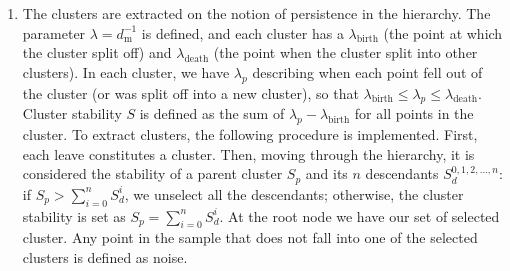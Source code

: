\documentclass[fleqn,usenatbib]{mnras}
\newcommand{\rlopes}[1]{\textcolor{blue}{#1}}
\begin{document}
\begin{enumerate}
\item The clusters are extracted on the notion of persistence in the hierarchy.
  The parameter $\lambda = d_{\mathrm{m}}^{-1}$ is defined, and each cluster has a
  $\lambda_{\mathrm{birth}}$ (the point at which the cluster split off) and
  $\lambda_{\mathrm{death}}$ (the point when the cluster split into other clusters).
  In each cluster, we have $\lambda_p$ describing when each point fell out of the
  cluster (or was split off into a new cluster), so that $\lambda_{\mathrm{birth}} \leq \lambda_{p} \leq \lambda_{\mathrm{death}}$.
  Cluster stability $S$ is defined as the sum of $\lambda_{p} - \lambda_{\mathrm{birth}}$
  for all points in the cluster. To extract clusters, the following procedure is
  implemented. First, %
  each leave constitutes a cluster. Then, moving through the
  hierarchy, it is considered the stability of a parent cluster $S_p$ and its $n$ descendants
  $S_d^{0,1,2,...,n}$: if $S_p > \sum_{i=0}^{n} S_d^i$, we unselect all the descendants; otherwise,
  the cluster stability is set as 
  $S_p = \sum_{i=0}^{n} S_d^i$. At the root node we have our set of selected 
  cluster. Any point in the sample that does not fall into one of the selected
  clusters is defined as noise.

  
\end{enumerate}
\end{document}
